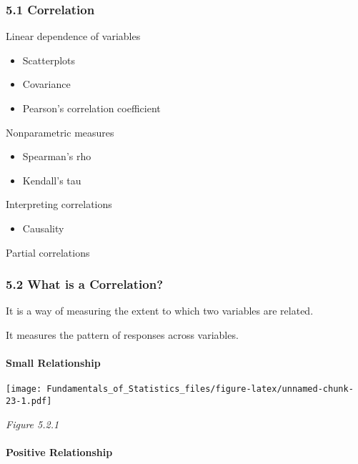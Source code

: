 \documentclass[]{article}
\providecommand{\tightlist}{%
  \setlength{\itemsep}{0pt}\setlength{\parskip}{0pt}}
\let\oldparagraph\paragraph
\renewcommand{\paragraph}[1]{\oldparagraph{#1}\mbox{}}
\begin{document}
\hypertarget{correlation}{%
\subsubsection{5.1 Correlation}\label{correlation}}

Linear dependence of variables

\begin{itemize}
\tightlist
\item
  Scatterplots
\item
  Covariance
\item
  Pearson's correlation coefficient
\end{itemize}

Nonparametric measures

\begin{itemize}
\tightlist
\item
  Spearman's rho
\item
  Kendall's tau
\end{itemize}

Interpreting correlations

\begin{itemize}
\tightlist
\item
  Causality
\end{itemize}

Partial correlations

\hypertarget{what-is-a-correlation}{%
\subsubsection{5.2 What is a Correlation?}\label{what-is-a-correlation}}

It is a way of measuring the extent to which two variables are related.

It measures the pattern of responses across variables.

\hypertarget{small-relationship}{%
\paragraph{Small Relationship}\label{small-relationship}}

\texttt{[image: Fundamentals\_of\_Statistics\_files/figure-latex/unnamed-chunk-23-1.pdf]}

\emph{Figure 5.2.1}

\hypertarget{positive-relationship}{%
\paragraph{Positive Relationship}\label{positive-relationship}}
\end{document}

